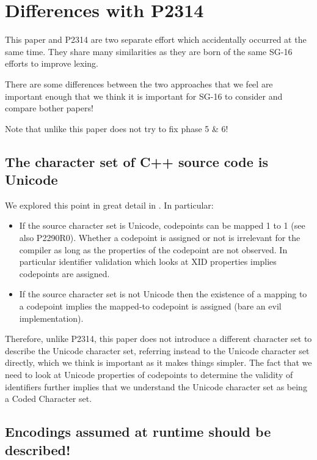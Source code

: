 \documentclass{wg21}
\begin{document}
\section{Differences with P2314}

This paper and P2314 are two separate effort which accidentally occurred at the same time.
They share many similarities as they are born of the same SG-16 efforts to improve lexing.

There are some differences between the two approaches that we feel are important enough that
we think it is important for SG-16 to consider and compare bother papers!

Note that unlike  this paper does not try to fix phase 5 \& 6!

\subsection{The character set of C++ source code is Unicode}

We explored this point in great detail in .
In particular:
\begin{itemize}
    \item If the source character set is Unicode, codepoints can be mapped 1 to 1 (see also P2290R0).
    Whether a codepoint is assigned or not is irrelevant for the compiler as long as the properties of the codepoint are not observed.
    In particular identifier validation which looks at XID properties implies codepoints are assigned.

    \item If the source character set is not Unicode then the existence of a mapping to a codepoint implies the mapped-to codepoint is assigned (bare an evil implementation).
\end{itemize}

Therefore, unlike P2314, this paper does not introduce a different character set to describe the Unicode character set, referring instead
to the Unicode character set directly, which we think is important as it makes things simpler.
The fact that we need to look at Unicode properties of codepoints to determine the validity of identifiers further implies that we understand the Unicode character set as being a Coded Character set.


\subsection{Encodings assumed at runtime should be described!}
\end{document}
